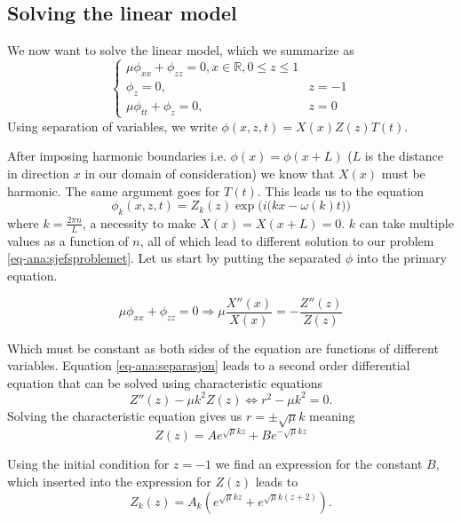 \documentclass[11pt]{article}
\begin{document}
\subsection{Solving the linear model}
We now want to solve the linear model, which we summarize as
\begin{equation}
\begin{cases}
\label{eq-ana:sjefsproblemet}
\mu \phi _{xx} + \phi_{zz} = 0, x \in \mathbb{R}, 0 \leq z \leq 1 \\
\phi _z = 0,    & z = -1 \\
\mu \phi_{tt} + \phi_z = 0, & z = 0
\end{cases}
\end{equation}
Using separation of variables, we write $\phi(x,z,t) = X(x)Z(z)T(t)$.

After imposing harmonic boundaries i.e. $\phi(x) = \phi(x+L)$ ($L$ is the distance in direction $x$ in our domain of consideration) we know that $X(x)$ must be harmonic. The same argument goes for $T(t)$. This leads us to the equation
\begin{equation*}
\phi_k (x,z,t) = Z_k(z) \exp \Big( i \big( kx - \omega(k)t \big) \Big)
\end{equation*}
where $k=\frac{2 \pi n}{L}$, a necessity to make $X(x) = X(x+L) = 0$. $k$ can take multiple values as a function of $n$, all of which lead to different solution to our problem \eqref{eq-ana:sjefsproblemet}. Let us start by putting the separated $\phi$ into the primary equation.

\begin{equation}
\mu \phi_{xx} + \phi_{zz} = 0 \Longrightarrow \mu \frac{X '' (x)}{X(x)} = -\frac{Z '' (z)}{Z(z)}
\label{eq-ana:separasjon}
\end{equation}

Which must be constant as both sides of the equation are functions of different variables. Equation \eqref{eq-ana:separasjon}
leads to a second order differential equation that can be solved using characteristic equations
\begin{equation*}
Z''(z) - \mu k^2 Z(z) \Longleftrightarrow r^2 - \mu k^2 = 0.
\end{equation*}
Solving the characteristic equation gives us $r = \pm \sqrt{\mu}k$ meaning
\begin{equation*}
Z(z) = A e^{\sqrt{\mu}k z} + Be^{-\sqrt{\mu}k z}
\end{equation*}

Using the initial condition for $z = -1$ we find an expression for the constant $B$, which inserted into the expression for $Z(z)$ leads to
\begin{equation*}
Z_k(z) = A_k \left( e^{\sqrt{\mu}kz} + e^{ \sqrt{\mu}k(z+2) } \right).
\end{equation*}
\end{document}
